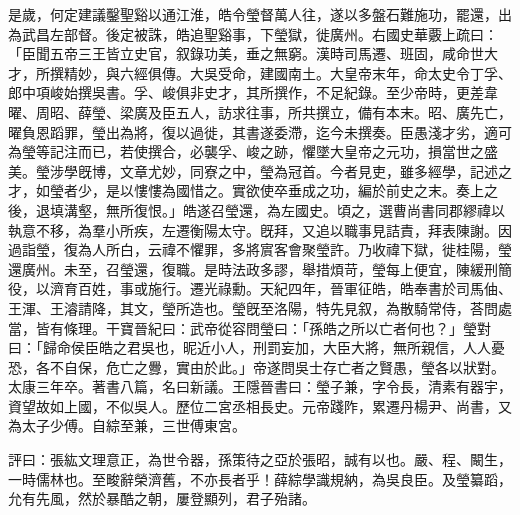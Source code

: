 \begin{pinyinscope}
是歲，何定建議鑿聖谿以通江淮，皓令瑩督萬人往，遂以多盤石難施功，罷還，出為武昌左部督。後定被誅，皓追聖谿事，下瑩獄，徙廣州。右國史華覈上疏曰：「臣聞五帝三王皆立史官，叙錄功美，垂之無窮。漢時司馬遷、班固，咸命世大才，所撰精妙，與六經俱傳。大吳受命，建國南土。大皇帝末年，命太史令丁孚、郎中項峻始撰吳書。孚、峻俱非史才，其所撰作，不足紀錄。至少帝時，更差韋曜、周昭、薛瑩、梁廣及臣五人，訪求往事，所共撰立，備有本末。昭、廣先亡，曜負恩蹈罪，瑩出為將，復以過徙，其書遂委滯，迄今未撰奏。臣愚淺才劣，適可為瑩等記注而已，若使撰合，必襲孚、峻之跡，懼墜大皇帝之元功，損當世之盛美。瑩涉學旣博，文章尤妙，同寮之中，瑩為冠首。今者見吏，雖多經學，記述之才，如瑩者少，是以慺慺為國惜之。實欲使卒垂成之功，編於前史之末。奏上之後，退填溝壑，無所復恨。」皓遂召瑩還，為左國史。頃之，選曹尚書同郡繆禕以執意不移，為羣小所疾，左遷衡陽太守。旣拜，又追以職事見詰責，拜表陳謝。因過詣瑩，復為人所白，云禕不懼罪，多將賔客會聚瑩許。乃收禕下獄，徙桂陽，瑩還廣州。未至，召瑩還，復職。是時法政多謬，舉措煩苛，瑩每上便宜，陳緩刑簡役，以濟育百姓，事或施行。遷光祿勳。天紀四年，晉軍征皓，皓奉書於司馬伷、王渾、王濬請降，其文，瑩所造也。瑩旣至洛陽，特先見叙，為散騎常侍，荅問處當，皆有條理。干寶晉紀曰：武帝從容問瑩曰：「孫皓之所以亡者何也？」瑩對曰：「歸命侯臣皓之君吳也，昵近小人，刑罰妄加，大臣大將，無所親信，人人憂恐，各不自保，危亡之釁，實由於此。」帝遂問吳士存亡者之賢愚，瑩各以狀對。太康三年卒。著書八篇，名曰新議。王隱晉書曰：瑩子兼，字令長，清素有器宇，資望故如上國，不似吳人。歷位二宮丞相長史。元帝踐阼，累遷丹楊尹、尚書，又為太子少傅。自綜至兼，三世傅東宮。

評曰：張紘文理意正，為世令器，孫策待之亞於張昭，誠有以也。嚴、程、闞生，一時儒林也。至畯辭榮濟舊，不亦長者乎！薛綜學識規納，為吳良臣。及瑩纂蹈，允有先風，然於暴酷之朝，屢登顯列，君子殆諸。


\end{pinyinscope}